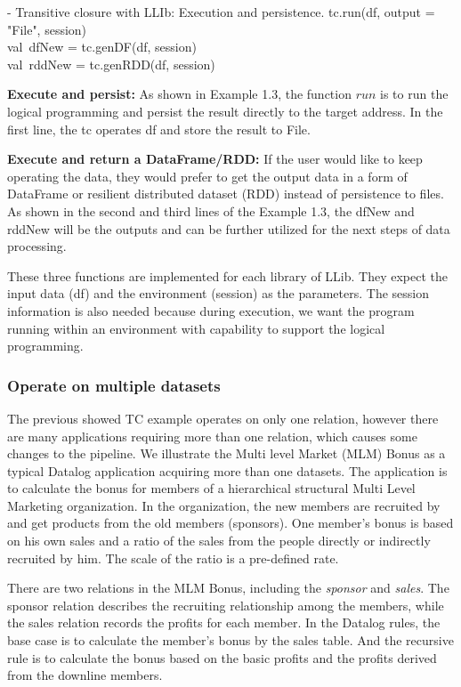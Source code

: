 \vspace{0.5em}
 - Transitive closure with LLIb:  Execution and persistence.
\bldl
tc.run(df, output = "File", session) \\
val\ dfNew = tc.genDF(df, session) \\
val\ rddNew = tc.genRDD(df, session) \\

\eldl

\textbf{Execute and persist:} As shown in Example 1.3, the function $run$ is to run the logical programming and persist the result directly to the target address. In the first line, the tc operates df and store the result to File. 

\textbf{Execute and return a DataFrame/RDD:} If the user would like to keep operating the data, they would prefer to get the output data in a form of DataFrame or resilient distributed dataset (RDD) instead of persistence to files. As shown in the second and third lines of the Example 1.3, the dfNew and rddNew will be the outputs and can be further utilized for the next steps of data processing. 


These three functions are implemented for each library of LLib. They expect the input data (df) and the environment (session) as the parameters.  The session information is also needed because during execution, we want the program running within an environment with capability to support the logical 
programming. 


\subsubsection{Operate on multiple datasets}
\label{sec:multiple}
The previous showed TC example operates on only one relation, however there are many applications requiring more than one relation, which causes some changes to the  pipeline. We illustrate the Multi level Market (MLM) Bonus as a typical Datalog application \citep{mlm} acquiring more than one datasets. The application is to calculate the bonus for members of a hierarchical structural Multi Level Marketing  organization. In the organization, the new members are recruited by  and get products from the old members (sponsors). One member's bonus is based on his own sales and a ratio of the sales from the people directly or indirectly recruited by him. The scale of the ratio is a pre-defined rate. 

There are two relations in the MLM Bonus, including the \textit{sponsor} and \textit{sales}. The sponsor relation describes the recruiting relationship among the members, while the sales relation records the profits for each member. In the Datalog rules, the base case is to calculate the member's bonus by the sales table. And the recursive rule is to calculate the bonus based on the basic profits and the profits derived from the downline members.

